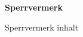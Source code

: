 \thispagestyle{empty}

\begin{titlepage}
  \vspace*{5cm}

  \begin{center}
    {\LARGE\bfseries Sperrvermerk}\\[2cm]
  \end{center}
Sperrvermerk inhalt
  \vfill
\end{titlepage}
